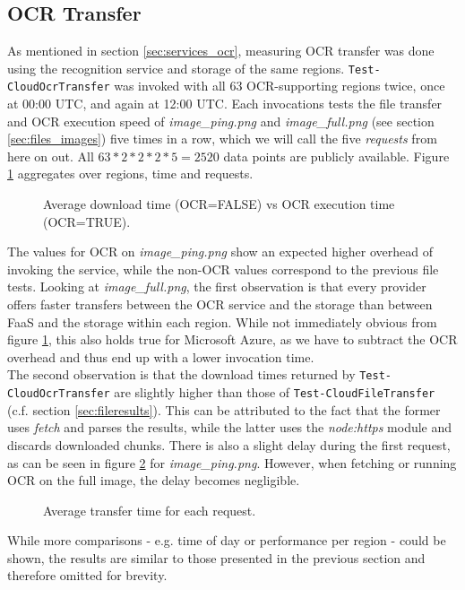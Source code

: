 \documentclass[a4paper,bibliography=totoc]{scrartcl}
\newcommand{\Azure}{Microsoft Azure\xspace}
\begin{document}
\FloatBarrier
\subsection{OCR Transfer}\label{ocrresults}
As mentioned in section \ref{sec:services_ocr}, measuring OCR transfer was done using the recognition service and storage of the same regions. \texttt{Test-CloudOcrTransfer}\cite{wb_invoke} was invoked with all 63 OCR-supporting regions twice, once at 00:00 UTC, and again at 12:00 UTC. Each invocations tests the file transfer and OCR execution speed of \textit{image\_ping.png} and \textit{image\_full.png} (see section \ref{sec:files_images}) five times in a row, which we will call the five \textit{requests} from here on out. All $63*2*2*2*5=2520$ data points are publicly available.\cite{wb_results_ocr} Figure \ref{fig:ocr_main} aggregates over regions, time and requests.\\
\begin{figure}[!ht]
    \centering
    
    \caption{Average download time (OCR=FALSE) vs OCR execution time (OCR=TRUE).}
    \label{fig:ocr_main}
\end{figure}%
The values for OCR on \textit{image\_ping.png} show an expected higher overhead of invoking the service, while the non-OCR values correspond to the previous file tests. Looking at \textit{image\_full.png}, the first observation is that every provider offers faster transfers between the OCR service and the storage than between FaaS and the storage within each region. While not immediately obvious from figure \ref{fig:ocr_main}, this also holds true for \Azure, as we have to subtract the OCR overhead and thus end up with a lower invocation time.\\
The second observation is that the download times returned by \texttt{Test-CloudOcrTransfer} are slightly higher than those of \texttt{Test-CloudFileTransfer} (c.f. section \ref{sec:fileresults}). This can be attributed to the fact that the former uses \textit{fetch} and parses the results, while the latter uses the \textit{node:https} module and discards downloaded chunks.\cite{wb_invoke} There is also a slight delay during the first request, as can be seen in figure \ref{fig:batch} for \textit{image\_ping.png}. However, when fetching or running OCR on the full image, the delay becomes negligible.\\
\begin{figure}[!ht]
    \centering
    \qquad
    \caption{Average transfer time for each request.}
    \label{fig:batch}
\end{figure}%
While more comparisons - e.g. time of day or performance per region - could be shown, the results are similar to those presented in the previous section and therefore omitted for brevity.
\end{document}
